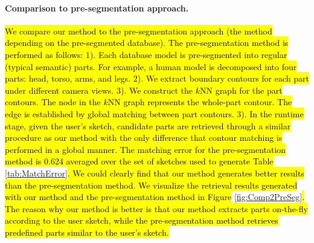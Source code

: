 \paragraph*{Comparison to pre-segmentation approach.}\hl{ We compare our method to the pre-segmentation approach (the method depending on the pre-segmented database). The pre-segmentation method is performed as follows: 1). Each database model is pre-segmented into regular (typical semantic) parts. For example, a human model is decomposed into four parts: head, torso, arms, and legs. 2). We extract boundary contours for each part under different camera views. 3). We construct the $k$NN graph for the part contours. The node in the $k$NN graph represents the whole-part contour. The edge is established by global matching between part contours. 3). In the runtime stage, given the user's sketch, candidate parts are retrieved through a similar procedure as our method with the only difference that contour matching is performed in a global manner. The matching error for the pre-segmentation method is 0.624 averaged over the set of sketches used to generate Table } \ref{tab:MatchError}\hl{. We could clearly find that our method generates better results than the pre-segmentation method. We visualize the retrieval results generated with our method and the pre-segmentation method in Figure }\ref{fig:Comp2PreSeg}\hl{. The reason why our method is better is that our method extracts parts on-the-fly according to the user sketch, while the pre-segmentation method retrieves predefined parts similar to the user's sketch.}
